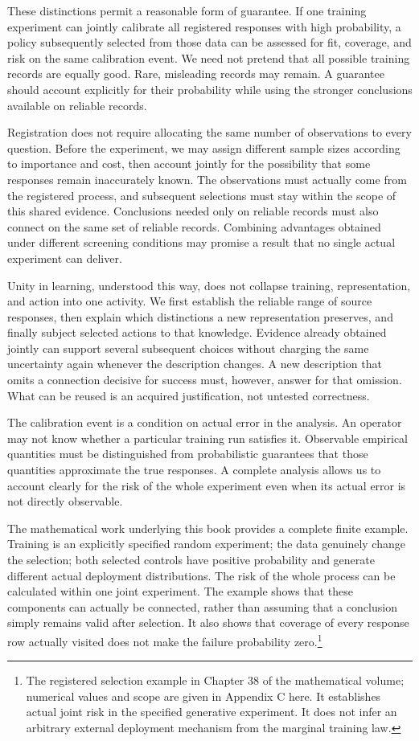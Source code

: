 \documentclass[
  english,
  11pt,
  oneside]{book}
\begin{document}
These distinctions permit a reasonable form of guarantee. If one training experiment can jointly calibrate all registered responses with high probability, a policy subsequently selected from those data can be assessed for fit, coverage, and risk on the same calibration event. We need not pretend that all possible training records are equally good. Rare, misleading records may remain. A guarantee should account explicitly for their probability while using the stronger conclusions available on reliable records.

Registration does not require allocating the same number of observations to every question. Before the experiment, we may assign different sample sizes according to importance and cost, then account jointly for the possibility that some responses remain inaccurately known. The observations must actually come from the registered process, and subsequent selections must stay within the scope of this shared evidence. Conclusions needed only on reliable records must also connect on the same set of reliable records. Combining advantages obtained under different screening conditions may promise a result that no single actual experiment can deliver.

Unity in learning, understood this way, does not collapse training, representation, and action into one activity. We first establish the reliable range of source responses, then explain which distinctions a new representation preserves, and finally subject selected actions to that knowledge. Evidence already obtained jointly can support several subsequent choices without charging the same uncertainty again whenever the description changes. A new description that omits a connection decisive for success must, however, answer for that omission. What can be reused is an acquired justification, not untested correctness.

The calibration event is a condition on actual error in the analysis. An operator may not know whether a particular training run satisfies it. Observable empirical quantities must be distinguished from probabilistic guarantees that those quantities approximate the true responses. A complete analysis allows us to account clearly for the risk of the whole experiment even when its actual error is not directly observable.

The mathematical work underlying this book provides a complete finite example. Training is an explicitly specified random experiment; the data genuinely change the selection; both selected controls have positive probability and generate different actual deployment distributions. The risk of the whole process can be calculated within one joint experiment. The example shows that these components can actually be connected, rather than assuming that a conclusion simply remains valid after selection. It also shows that coverage of every response row actually visited does not make the failure probability zero.\footnote{\hypertarget{ph-note-25}{}The registered selection example in Chapter 38 of the mathematical volume; numerical values and scope are given in Appendix C here. It establishes actual joint risk in the specified generative experiment. It does not infer an arbitrary external deployment mechanism from the marginal training law.}
\end{document}
